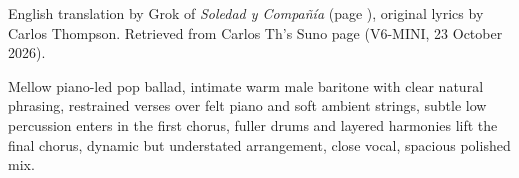 
\label{sec:alone-or-only-alone}
\begin{notes}
English translation by Grok of \emph{Soledad y Compañía} (page \pageref{sec:soledad-y-compania}), original lyrics by Carlos Thompson. Retrieved from Carlos Th's Suno page (V6-MINI, 23 October 2026).
\end{notes}
\begin{style}
Mellow piano-led pop ballad, intimate warm male baritone with clear natural phrasing, restrained verses over felt piano and soft ambient strings, subtle low percussion enters in the first chorus, fuller drums and layered harmonies lift the final chorus, dynamic but understated arrangement, close vocal, spacious polished mix.
\end{style}
